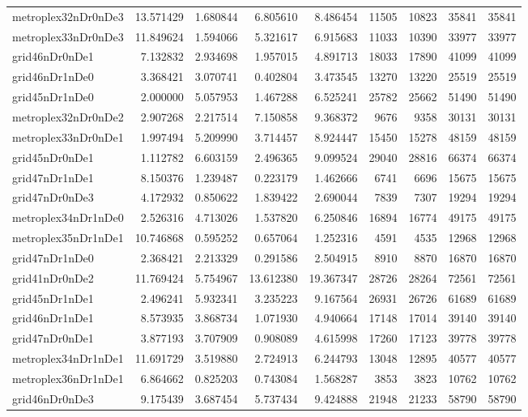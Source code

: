 \begin{longtable}{|l|r|r|r|r|r|r|r|r|}
metroplex32nDr0nDe3 & 13.571429 & 1.680844 & 6.805610 & 8.486454 & 11505 & 10823 & 35841 & 35841 \\
metroplex33nDr0nDe3 & 11.849624 & 1.594066 & 5.321617 & 6.915683 & 11033 & 10390 & 33977 & 33977 \\
grid46nDr0nDe1 & 7.132832 & 2.934698 & 1.957015 & 4.891713 & 18033 & 17890 & 41099 & 41099 \\
grid46nDr1nDe0 & 3.368421 & 3.070741 & 0.402804 & 3.473545 & 13270 & 13220 & 25519 & 25519 \\
grid45nDr1nDe0 & 2.000000 & 5.057953 & 1.467288 & 6.525241 & 25782 & 25662 & 51490 & 51490 \\
metroplex32nDr0nDe2 & 2.907268 & 2.217514 & 7.150858 & 9.368372 & 9676 & 9358 & 30131 & 30131 \\
metroplex33nDr0nDe1 & 1.997494 & 5.209990 & 3.714457 & 8.924447 & 15450 & 15278 & 48159 & 48159 \\
grid45nDr0nDe1 & 1.112782 & 6.603159 & 2.496365 & 9.099524 & 29040 & 28816 & 66374 & 66374 \\
grid47nDr1nDe1 & 8.150376 & 1.239487 & 0.223179 & 1.462666 & 6741 & 6696 & 15675 & 15675 \\
grid47nDr0nDe3 & 4.172932 & 0.850622 & 1.839422 & 2.690044 & 7839 & 7307 & 19294 & 19294 \\
metroplex34nDr1nDe0 & 2.526316 & 4.713026 & 1.537820 & 6.250846 & 16894 & 16774 & 49175 & 49175 \\
metroplex35nDr1nDe1 & 10.746868 & 0.595252 & 0.657064 & 1.252316 & 4591 & 4535 & 12968 & 12968 \\
grid47nDr1nDe0 & 2.368421 & 2.213329 & 0.291586 & 2.504915 & 8910 & 8870 & 16870 & 16870 \\
grid41nDr0nDe2 & 11.769424 & 5.754967 & 13.612380 & 19.367347 & 28726 & 28264 & 72561 & 72561 \\
grid45nDr1nDe1 & 2.496241 & 5.932341 & 3.235223 & 9.167564 & 26931 & 26726 & 61689 & 61689 \\
grid46nDr1nDe1 & 8.573935 & 3.868734 & 1.071930 & 4.940664 & 17148 & 17014 & 39140 & 39140 \\
grid47nDr0nDe1 & 3.877193 & 3.707909 & 0.908089 & 4.615998 & 17260 & 17123 & 39778 & 39778 \\
metroplex34nDr1nDe1 & 11.691729 & 3.519880 & 2.724913 & 6.244793 & 13048 & 12895 & 40577 & 40577 \\
metroplex36nDr1nDe1 & 6.864662 & 0.825203 & 0.743084 & 1.568287 & 3853 & 3823 & 10762 & 10762 \\
grid46nDr0nDe3 & 9.175439 & 3.687454 & 5.737434 & 9.424888 & 21948 & 21233 & 58790 & 58790 \\

\end{longtable}
